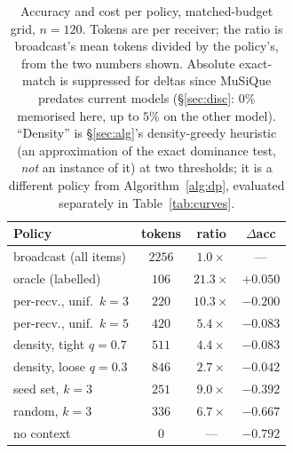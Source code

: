\documentclass[sigconf,anonymous]{aamas}
\theoremstyle{remark}
\begin{document}
\begin{table}[t]
\centering
\caption{Accuracy and cost per policy, matched-budget grid, $n=120$.
Tokens are per receiver; the ratio is broadcast's mean tokens divided
by the policy's, from the two numbers shown. Absolute exact-match is
suppressed for deltas since MuSiQue predates current models
(\S\ref{sec:disc}: $0\%$ memorised here, up to $5\%$ on the other
model). ``Density'' is \S\ref{sec:alg}'s density-greedy heuristic (an
approximation of the exact dominance test, \emph{not} an instance of
it) at two thresholds; it is a different policy from
Algorithm~\ref{alg:dp}, evaluated separately in Table~\ref{tab:curves}.}
\label{tab:policies}
\small
\begin{tabular}{lccc}
\toprule
Policy & tokens & ratio & $\Delta$acc \\
\midrule
broadcast (all items)  & $2256$ & $1.0\times$  & --- \\
oracle (labelled)      & $106$  & $21.3\times$ & $+0.050$ \\
per-recv., unif.\ $k{=}3$ & $220$ & $10.3\times$ & $-0.200$ \\
per-recv., unif.\ $k{=}5$ & $420$ & $5.4\times$ & $-0.083$ \\
density, tight $q{=}0.7$ & $511$ & $4.4\times$  & $-0.083$ \\
density, loose $q{=}0.3$ & $846$ & $2.7\times$  & $-0.042$ \\
seed set, $k{=}3$      & $251$  & $9.0\times$  & $-0.392$ \\
random, $k{=}3$        & $336$  & $6.7\times$  & $-0.667$ \\
no context             & $0$    & ---          & $-0.792$ \\
\bottomrule
\end{tabular}
\end{table}
\end{document}
